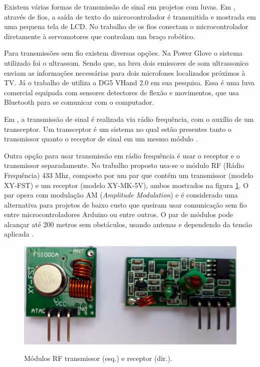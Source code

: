 \documentclass[
	12pt,				%
	openright,			%
	oneside,			%
	a4paper,			%
	english,			%
	brazil				%
	]{abntex2}
\begin{document}
		Existem várias formas de transmissão de sinal em projetos com luvas. Em \cite{solanki2013sign}, através de fios, a saída de texto do microcontrolador é transmitida e mostrada em uma pequena tela de LCD. No trabalho de \cite{syed2012armcontroller} os fios conectam o microcontrolador diretamente à servomotores que controlam um braço robótico.

		Para transmissões sem fio existem diversas opções. Na Power Glove \cite{dana1989powerglove} o sistema utilizado foi o ultrassom. Sendo que, na luva dois emissores de som ultrassonico enviam as informações necessárias para dois microfones localizados próximos à TV. Já o trabalho de \cite{kumar2012hci} utiliza a DG5 VHand 2.0 em sua pesquisa. Essa é uma luva comercial equipada com sensores detectores de flexão e movimentos, que usa Bluetooth para se comunicar com o computador.
		
		Em \cite{michela2013rehab}, a transmissão de sinal é realizada via rádio frequência, com o auxílio de um transceptor. Um transceptor é um sistema no qual estão presentes tanto o transmissor quanto o receptor de sinal em um mesmo módulo \cite{scott2017transceiver}.

		Outra opção para usar transmissão em rádio frequência é usar o receptor e o transmissor separadamente. No trabalho proposto usa-se o módulo RF (Rádio Frequência) 433 Mhz, composto por um par que contém um transmissor (modelo XY-FST) e um receptor (modelo XY-MK-5V), ambos mostrados na figura \ref{Fig:tx-rx1}. O par opera com modulação AM (\textit{Amplitude Modulation}) e é considerado uma alternativa para projetos de baixo custo que queiram usar comunicação sem fio entre microcontroladores Arduino ou entre outros. O par de módulos pode alcançar até 200 metros sem obstáculos, usando antenas e dependendo da tensão aplicada \cite{institutodigitalrf}.


		\begin{figure}[h!]
			\centering
			\caption{Módulos RF transmissor (esq.) e receptor (dir.).}
  		\includegraphics[width=12cm]{./figures/tx-rx1.jpg}
  		\label{Fig:tx-rx1}
		\end{figure}
\end{document}
